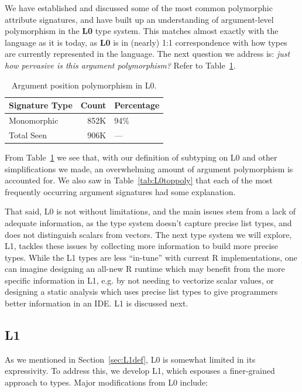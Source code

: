 \documentclass[acmsmall,10pt,review,anonymous]{acmart}\settopmatter{printfolios=true,printccs=false,printacmref=false}
\begin{document}
We have established and discussed some of the most common polymorphic attribute signatures, and have built up an understanding of argument-level polymorphism in the {\bf L0} type system.
This matches almost exactly with the language as it is today, as {\bf L0} is in (nearly) 1:1 correspondence with how types are currently represented in the language.
The next question we address is: {\it just how pervasive is this argument polymorphism?}
Refer to Table~\ref{tab:L0argcounts}.

\begin{table}[ht]\centering
\begin{tabular}{lrl}
  \hline
Signature Type & Count & Percentage \\ 
  \hline
Monomorphic & 852K & 94\% \\ 
  Total Seen & 906K & --- \\ 
   \hline
\end{tabular}
\caption{Argument position polymorphism in L0.}
\label{tab:L0argcounts}
\end{table}

From Table~\ref{tab:L0argcounts} we see that, with our definition of subtyping on L0 and other simplifications we made, an overwhelming amount of argument polymorphism is accounted for.
We also saw in Table~\ref{tab:L0toppoly} that each of the most frequently occurring argument signatures had some explanation.

That said, L0 is not without limitations, and the main issues stem from a lack of adequate information, as the type system doesn't capture precise list types, and does not distinguish scalars from vectors.
The next type system we will explore, L1, tackles these issues by collecting more information to build more precise types.
While the L1 types are less ``in-tune'' with current R implementations, one can imagine designing an all-new R runtime which may benefit from the more specific information in L1, e.g. by not needing to vectorize scalar values, or designing a static analysis which uses precise list types to give programmers better information in an IDE.
L1 is discussed next.

%
%
%
%
\subsection{L1}

As we mentioned in Section~\ref{sec:L1def}, L0 is somewhat limited in its expressivity. 
To address this, we develop L1, which espouses a finer-grained approach to types. 
Major modifications from L0 include:
\end{document}
